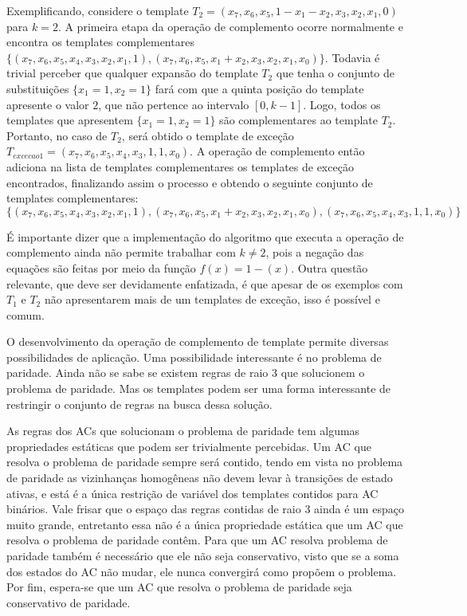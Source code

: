 \documentclass[12pt,a4paper]{article}
\begin{document}
	Exemplificando, considere o template $T_2 = (x_7, x_6, x_5, 1 - x_1 - x_2, x_3, x_2, x_1, 0)$ para $k=2$.
	A primeira etapa da operação de complemento ocorre normalmente e encontra os templates complementares $\{(x_7, x_6, x_5, x_4, x_3, x_2, x_1, 1),(x_7, x_6, x_5, x_1 + x_2, x_3, x_2, x_1, x_0)\}$.
	Todavia é trivial perceber que qualquer expansão do template $T_2$ que tenha o conjunto de substituições $\{x_1 = 1, x_2 = 1\}$ fará com que a quinta posição do template apresente o valor $2$, que não pertence ao intervalo $[0,k-1]$.
	Logo, todos os templates que apresentem $\{x_1 = 1, x_2 = 1\}$ são complementares ao template $T_2$.
	Portanto, no caso de $T_2$, será obtido o template de exceção $T_{excecao 1} = (x_7, x_6, x_5, x_4, x_3, 1, 1, x_0)$. 
	A operação de complemento então adiciona na lista de templates complementares os templates de exceção encontrados, finalizando assim o processo e obtendo o seguinte conjunto de templates complementares:
	\begin{equation}
	\{(x_7, x_6, x_5, x_4, x_3, x_2, x_1, 1),(x_7, x_6, x_5, x_1 + x_2, x_3, x_2, x_1, x_0),(x_7, x_6, x_5, x_4, x_3, 1, 1, x_0)\}
	\label{eq:complementionSet}
	\end{equation}

	É importante dizer que a implementação do algoritmo que executa a operação de complemento ainda não permite trabalhar com $k\neq 2$, pois a negação das equações são feitas por meio da função $f(x) = 1 - (x)$. Outra questão relevante, que deve ser devidamente enfatizada, é que apesar de os exemplos com $T_1$ e $T_2$ não apresentarem mais de um templates de exceção, isso é possível e comum.

	O desenvolvimento da operação de complemento de template permite diversas possibilidades de aplicação. 
	Uma possibilidade interessante é no problema de paridade. 
	Ainda não se sabe se existem regras de raio 3 que solucionem o problema de paridade. 
	Mas os templates podem ser uma forma interessante de restringir o conjunto de regras na busca dessa solução.

	As regras dos ACs que solucionam o problema de paridade tem algumas propriedades estáticas que podem ser trivialmente percebidas. 
	Um AC que resolva o problema de paridade sempre será contido, tendo em vista no problema de paridade as vizinhanças homogêneas não devem levar à transições de estado ativas, e está é a única restrição de variável dos templates contidos para AC binários. 
	Vale frisar que o espaço das regras contidas de raio 3 ainda é um espaço muito grande, entretanto essa não é a única propriedade estática que um AC que resolva o problema de paridade contêm. 
	Para que um AC resolva problema de paridade também é necessário que ele não seja conservativo, visto que se a soma dos estados do AC não mudar, ele nunca convergirá como propõem o problema. 
	Por fim, espera-se que um AC que resolva o problema de paridade seja conservativo de paridade.
\end{document}
